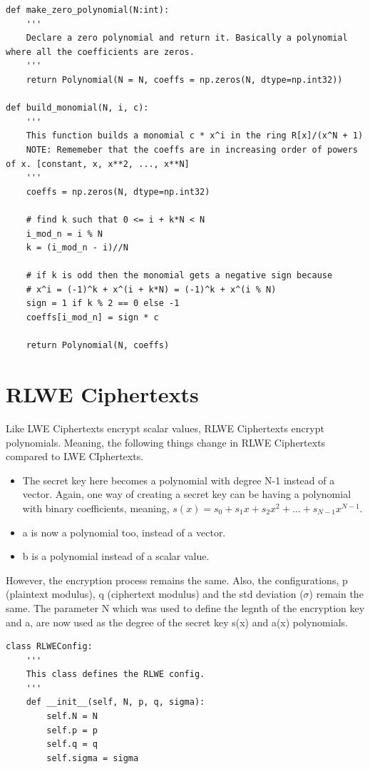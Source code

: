 \documentclass{report}
\begin{document}
\begin{verbatim}
def make_zero_polynomial(N:int):
	'''
	Declare a zero polynomial and return it. Basically a polynomial where all the coefficients are zeros.
	'''
	return Polynomial(N = N, coeffs = np.zeros(N, dtype=np.int32))
	
def build_monomial(N, i, c):
	'''
	This function builds a monomial c * x^i in the ring R[x]/(x^N + 1)
	NOTE: Rememeber that the coeffs are in increasing order of powers of x. [constant, x, x**2, ..., x**N]
	'''
	coeffs = np.zeros(N, dtype=np.int32)
	
	# find k such that 0 <= i + k*N < N
	i_mod_n = i % N
	k = (i_mod_n - i)//N
	
	# if k is odd then the monomial gets a negative sign because
	# x^i = (-1)^k + x^(i + k*N) = (-1)^k + x^(i % N)
	sign = 1 if k % 2 == 0 else -1
	coeffs[i_mod_n] = sign * c
	
	return Polynomial(N, coeffs)
\end{verbatim}
		
	\section{RLWE Ciphertexts}
		Like LWE Ciphertexts encrypt scalar values, RLWE Ciphertexts encrypt polynomials. Meaning, the following things change in RLWE Ciphertexts compared to LWE CIphertexts.
		\begin{itemize}
			\item  The secret key here becomes a polynomial with degree N-1 instead of a vector. Again, one way of creating a secret key can be having a polynomial with binary coefficients, meaning, $s(x) = s_0 + s_1x + s_2x^2 + ... + s_{N-1}x^{N-1}$.
			\item a is now a polynomial too, instead of a vector.
			\item b is a polynomial instead of a scalar value.
		\end{itemize}
		However, the encryption process remains the same. Also, the configurations, p (plaintext modulus), q (ciphertext modulus) and the std deviation ($\sigma$) remain the same. The parameter N which was used to define the legnth of the encryption key and a, are now used as the degree of the secret key s(x) and a(x) polynomials.
		\begin{verbatim}
class RLWEConfig:
	'''
	This class defines the RLWE config.
	'''
	def __init__(self, N, p, q, sigma):
		self.N = N
		self.p = p
		self.q = q
		self.sigma = sigma
		\end{verbatim}
\end{document}
